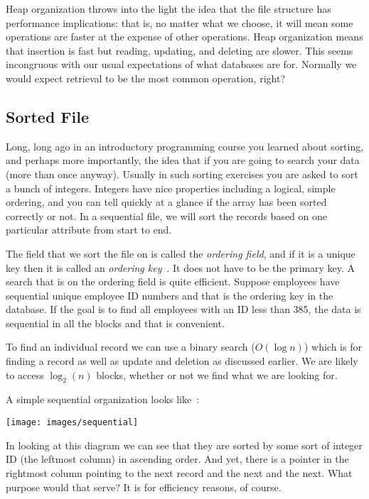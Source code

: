 \documentclass[a4paper]{report}
\begin{document}
Heap organization throws into the light the idea that the file structure has performance implications: that is, no matter what we choose, it will mean some operations are faster at the expense of other operations. Heap organization means that insertion is fast but reading, updating, and deleting are slower. This seems incongruous with our usual expectations of what databases are for. Normally we would expect retrieval to be the most common operation, right?

\subsection*{Sorted File}

Long, long ago in an introductory programming course you learned about sorting, and perhaps more importantly, the idea that if you are going to search your data (more than once anyway). Usually in such sorting exercises you are asked to sort a bunch of integers. Integers have nice properties including a logical, simple ordering, and you can tell quickly at a glance if the array has been sorted correctly or not. In a sequential file, we will sort the records based on one particular attribute from start to end.

The field that we sort the file on is called the \textit{ordering field}, and if it is a  unique key then it is called an \textit{ordering key}~\cite{fds}. It does not have to be the primary key. A search that is on the ordering field is quite efficient. Suppose employees have sequential unique employee ID numbers and that is the ordering key in the database. If the goal is to find all employees with an ID less than 385, the data is sequential in all the blocks and that is convenient.

To find an individual record we can use a binary search ($O(\log n)$) which is for finding a record as well as update and deletion as discussed earlier. We are likely to access $\log_{2}(n)$ blocks, whether or not we find what we are looking for.

A simple sequential organization looks like~\cite{dsc}:

\begin{center}
\texttt{[image: images/sequential]}
\end{center}

In looking at this diagram we can see that they are sorted by some sort of integer ID (the leftmost column) in ascending order. And yet, there is a pointer in the rightmost column pointing to the next record and the next and the next. What purpose would that serve? It is for efficiency reasons, of course. 
\end{document}
